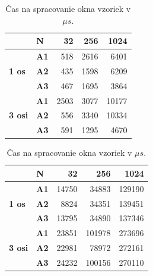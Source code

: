 \begin{table}[h]
     \def\arraystretch{1.25}
	 \centering
     \captionsetup[subtable]{position=below}

     \begin{subtable}{0.48\linewidth}
         \centering
		\begin{tabular}{|l|l|r|r|r|}
		\hline
		\textbf{}                       & \textbf{N}  & \textbf{32} & \textbf{256} & \textbf{1024} \\ \hline
		\multirow{3}{*}{\textbf{1 os}}  & \textbf{A1} & 518         & 2616         & 6401          \\ \cline{2-5}
 		                                & \textbf{A2} & 435         & 1598         & 6209          \\ \cline{2-5}
                                        & \textbf{A3} & 467         & 1695         & 3864          \\ \hline
		\multirow{3}{*}{\textbf{3 osi}} & \textbf{A1} & 2503        & 3077         & 10177         \\ \cline{2-5}
                                        & \textbf{A2} & 556         & 3340         & 10334         \\ \cline{2-5}
                                        & \textbf{A3} & 591         & 1295         & 4670          \\ \hline
		\end{tabular}
		\caption{V pokoji bez posielania správ}
		\label{tab:pipeline-simple}
	\end{subtable}
    \hfill
    \begin{subtable}{0.48\linewidth}
         \centering
		\begin{tabular}{|l|l|r|r|r|}
		\hline
		\textbf{}                       & \textbf{N}  & \textbf{32} & \textbf{256} & \textbf{1024} \\ \hline
		\multirow{3}{*}{\textbf{1 os}}  & \textbf{A1} & 14750       & 34883        & 129190        \\ \cline{2-5}
                              			& \textbf{A2} & 8824        & 34351        & 139451        \\ \cline{2-5}
                                        & \textbf{A3} & 13795       & 34890        & 137346        \\ \hline
		\multirow{3}{*}{\textbf{3 osi}} & \textbf{A1} & 23851       & 101978       & 273696        \\ \cline{2-5}
                                        & \textbf{A2} & 22981       & 78972        & 272161        \\ \cline{2-5}
                                        & \textbf{A3} & 24232       & 100156       & 270110        \\ \hline
		\end{tabular}
		\caption{Štatistiky s koreláciami a udalosti}
		\label{tab:pipeline-complex}
	\end{subtable}

	 \captionsetup[table]{position=below}
     \caption{Čas na spracovanie okna vzoriek v $\mu s$.}
     \label{tab:pipeline}
\end{table}


